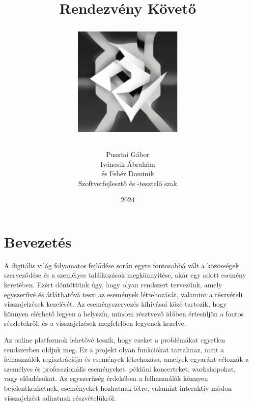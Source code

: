 \documentclass[colorlinks]{thesis-kando}
\theoremstyle{definition}
\theoremstyle{remark}
\begin{document}
\title{Rendezvény Követő\\[1em]
	\begin{center}
		\includegraphics[width=0.4\textwidth]{logo.jpg}
\end{center}}
\author{Pusztai Gábor\\ Iváncsik Ábrahám\\és Fehér Dominik\\Szoftverfejlesztő és -tesztelő szak}
\date{2024}
\maketitle

\tableofcontents

\chapter*{Bevezetés}

A digitális világ folyamatos fejlődése során egyre fontosabbá vált a közösségek szerveződése és a személyes találkozások megkönnyítése, akár egy adott esemény keretében. Ezért döntöttünk úgy, hogy olyan rendszert tervezünk, amely egyszerűvé és átláthatóvá teszi az események létrehozását, valamint a részvételi visszajelzések kezelését. Az eseményszervezés kihívásai közé tartozik, hogy könnyen elérhető legyen a helyszín, minden résztvevő időben értesüljön a fontos részletekről, és a visszajelzések megfelelően legyenek kezelve.

 Az online platformok lehetővé teszik, hogy ezeket a problémákat egyetlen rendszerben oldjuk meg. Ez a projekt olyan funkciókat tartalmaz, mint a felhasználók regisztrációja és események létrehozása, amelyek egyaránt célozzák a személyes és professzionális eseményeket, például koncerteket, workshopokat, vagy előadásokat. Az egyszerűség érdekében a felhasználók könnyen bejelentkezhetnek, eseményeket hozhatnak létre, valamint interaktív módon visszajelzést adhatnak részvételükről.
 
\end{document}
